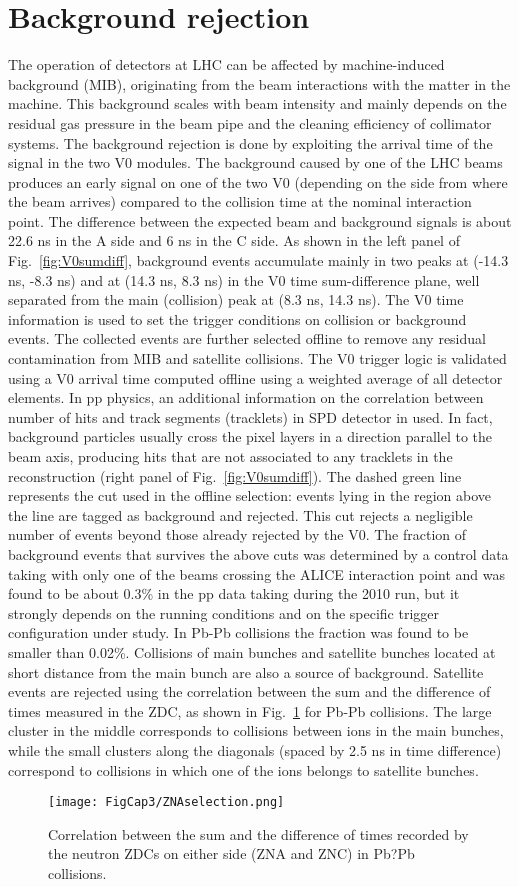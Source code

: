 \section{Background rejection}
\label{sec:BkgRejection}
The operation of detectors at LHC can be affected by machine-induced
background (MIB), originating from the beam interactions with the matter in the machine.
This background scales with beam intensity and mainly depends on the 
residual gas pressure in the beam pipe and the cleaning efficiency of collimator systems.
The background rejection is done by exploiting the arrival time of the signal in the two V0 modules.
The background caused by one of the LHC beams produces an early
signal on one of the two V0 (depending on the side from where the beam arrives) 
compared to the collision time at the nominal interaction point.
The difference between the expected beam and background signals 
is about 22.6 ns in the A side and 6 ns in the C side. As shown in the left panel of Fig.~\ref{fig:V0sumdiff}, 
background events accumulate mainly in two peaks at (-14.3 ns, -8.3 ns)
and at (14.3 ns, 8.3 ns) in the V0 time sum-difference plane, 
well separated from the main (collision) peak at (8.3 ns, 14.3 ns). 
The V0 time information is 
used to set the trigger conditions on collision or background events. 
The collected events are further selected offline to remove any residual
contamination from MIB and satellite collisions.
The V0 trigger logic is validated using a V0 arrival time 
computed offline using a weighted average of all detector elements.
In pp physics, an additional information on the correlation
between number of hits and track segments (tracklets) in SPD detector in used.
In fact, background particles usually cross the pixel layers in a 
direction parallel to the beam axis, producing hits that are not associated 
to any tracklets in the reconstruction (right panel of Fig.~\ref{fig:V0sumdiff}).
The dashed green line represents the cut used in the offline selection: 
events lying in the region above the line are tagged as background and rejected.
This cut rejects a negligible number of events beyond those already rejected by the V0. 
The fraction of background events that survives the above cuts was determined
by a control data taking with only one of the beams crossing the ALICE 
interaction point and was found to be about 0.3\% in the pp data taking 
during the 2010 run, but it strongly depends 
on the running conditions and on the specific trigger configuration under study. 
In Pb-Pb collisions the fraction was found to be smaller than 0.02\%.
Collisions of main bunches and satellite bunches located at short 
distance from the main bunch are also a source of background. 
Satellite events are rejected using the correlation between the sum and the difference 
of times measured in the ZDC, as shown in Fig.~\ref{fig:ZNAselection} for Pb-Pb collisions.
The large cluster in the middle corresponds to collisions between ions 
in the main bunches, while the small clusters along the diagonals (spaced by 
2.5 ns in time difference) correspond to collisions in which one of the ions belongs
to satellite bunches.

\begin{figure}[!t]
\centering
\texttt{[image: FigCap3/ZNAselection.png]}
\caption{Correlation between the sum and the difference of times recorded by the neutron ZDCs on either side (ZNA and ZNC) in Pb?Pb collisions. }
\label{fig:ZNAselection}
\end{figure}
